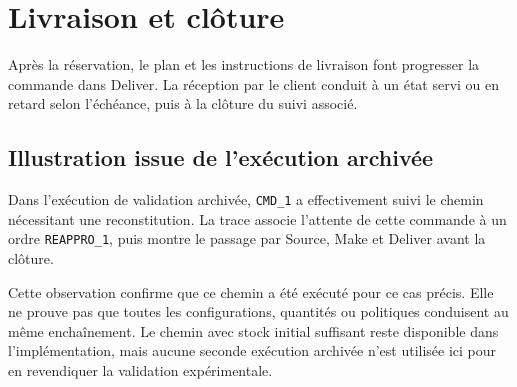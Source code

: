 \section{Livraison et clôture}

Après la réservation, le plan et les instructions de livraison font progresser la commande dans Deliver. La réception par le client conduit à un état servi ou en retard selon l'échéance, puis à la clôture du suivi associé.

\subsection{Illustration issue de l'exécution archivée}

Dans l'exécution de validation archivée, \texttt{CMD\_1} a effectivement suivi le chemin nécessitant une reconstitution. La trace associe l'attente de cette commande à un ordre \texttt{REAPPRO\_1}, puis montre le passage par Source, Make et Deliver avant la clôture.

Cette observation confirme que ce chemin a été exécuté pour ce cas précis. Elle ne prouve pas que toutes les configurations, quantités ou politiques conduisent au même enchaînement. Le chemin avec stock initial suffisant reste disponible dans l'implémentation, mais aucune seconde exécution archivée n'est utilisée ici pour en revendiquer la validation expérimentale.

